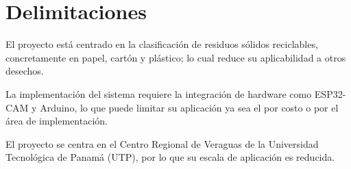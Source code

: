 \section{Delimitaciones}
El proyecto está centrado en la clasificación de residuos sólidos reciclables, concretamente en papel, cartón y plástico; lo cual reduce su aplicabilidad a otros desechos.

La implementación del sistema requiere la integración de hardware como ESP32-CAM y Arduino, lo que puede limitar su aplicación ya sea el por costo o por el área de implementación.

El proyecto se centra en el Centro Regional de Veraguas de la Universidad Tecnológica de Panamá (UTP), por lo que su escala de aplicación es reducida.